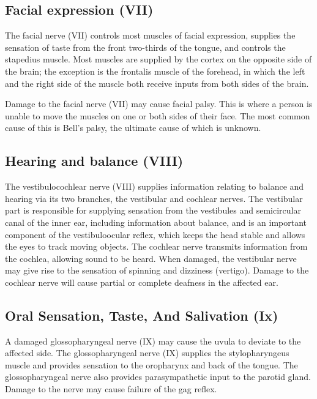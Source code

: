 \hypertarget{facial-expression-vii}{%
\subsection{Facial expression (VII)}\label{facial-expression-vii}}

The facial nerve (VII) controls most muscles of facial expression, supplies the sensation of taste from the front two-thirds of the tongue, and controls the stapedius muscle. Most muscles are supplied by the cortex on the opposite side of the brain; the exception is the frontalis muscle of the forehead, in which the left and the right side of the muscle both receive inputs from both sides of the brain.

Damage to the facial nerve (VII) may cause facial palsy. This is where a person is unable to move the muscles on one or both sides of their face. The most common cause of this is Bell's palsy, the ultimate cause of which is unknown.

\hypertarget{hearing-and-balance-viii}{%
\subsection{Hearing and balance (VIII)}\label{hearing-and-balance-viii}}

The vestibulocochlear nerve (VIII) supplies information relating to balance and hearing via its two branches, the vestibular and cochlear nerves. The vestibular part is responsible for supplying sensation from the vestibules and semicircular canal of the inner ear, including information about balance, and is an important component of the vestibuloocular reflex, which keeps the head stable and allows the eyes to track moving objects. The cochlear nerve transmits information from the cochlea, allowing sound to be heard. When damaged, the vestibular nerve may give rise to the sensation of spinning and dizziness (vertigo). Damage to the cochlear nerve will cause partial or complete deafness in the affected ear.

\hypertarget{oral-sensation-taste-and-salivation-ix}{%
\subsection{Oral Sensation, Taste, And Salivation (Ix)}\label{oral-sensation-taste-and-salivation-ix}}

A damaged glossopharyngeal nerve (IX) may cause the uvula to deviate to the affected side.
The glossopharyngeal nerve (IX) supplies the stylopharyngeus muscle and provides sensation to the oropharynx and back of the tongue. The glossopharyngeal nerve also provides parasympathetic input to the parotid gland. Damage to the nerve may cause failure of the gag reflex.


